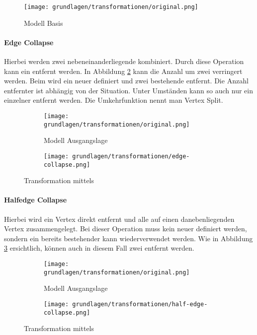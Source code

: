 \begin{figure}[H]
  \centering
  \texttt{[image: grundlagen/transformationen/original.png]}
  \caption{Modell Basis}
  \label{fig:transformationOriginal}
\end{figure}

\paragraph{Edge Collapse}
Hierbei werden zwei nebeneinanderliegende  kombiniert. Durch diese Operation kann ein  entfernt werden. In Abbildung \ref{fig:transformationEdgeCollapse} kann die Anzahl  um zwei verringert werden. Beim  wird ein neuer  definiert und zwei bestehende entfernt. Die Anzahl entfernter  ist abhängig von der Situation. Unter Umständen kann so auch nur ein einzelner  entfernt werden.
Die Umkehrfunktion nennt man Vertex Split.

\begin{figure}[H]
  \centering
  \begin{subfigure}{.5\textwidth}
    \centering
    \texttt{[image: grundlagen/transformationen/original.png]}
    \caption{Modell Ausgangslage}
  \end{subfigure}%
  \begin{subfigure}{.5\textwidth}
    \centering
    \texttt{[image: grundlagen/transformationen/edge-collapse.png]}
    \caption{}
  \end{subfigure}
  \caption{Transformation mittels }
  \label{fig:transformationEdgeCollapse}
\end{figure}

\paragraph{Halfedge Collapse}
Hierbei wird ein Vertex direkt entfernt und alle  auf einen danebenliegenden Vertex zusammengelegt. Bei dieser Operation muss kein neuer  definiert werden, sondern ein bereits bestehender  kann wiederverwendet werden. Wie in Abbildung \ref{fig:transformationHalfedgeCollapse} ersichtlich, können auch in diesem Fall zwei  entfernt werden.

\begin{figure}[H]
  \centering
  \begin{subfigure}{.5\textwidth}
    \centering
    \texttt{[image: grundlagen/transformationen/original.png]}
    \caption{Modell Ausgangslage}
  \end{subfigure}%
  \begin{subfigure}{.5\textwidth}
    \centering
    \texttt{[image: grundlagen/transformationen/half-edge-collapse.png]}
    \caption{}
  \end{subfigure}
  \caption{Transformation mittels }
  \label{fig:transformationHalfedgeCollapse}
\end{figure}

